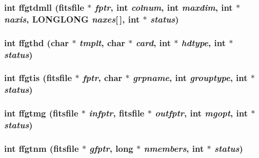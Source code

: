 \subsubsection{\setlength{\rightskip}{0pt plus 5cm}int ffgtdmll (\bf{fitsfile} $\ast$ {\em fptr}, int {\em colnum}, int {\em maxdim}, int $\ast$ {\em naxis}, \bf{LONGLONG} {\em naxes}[$\,$], int $\ast$ {\em status})}\label{fitsio_8h_37098ac493b769dba1d2055cbc7d3c28}


\subsubsection{\setlength{\rightskip}{0pt plus 5cm}int ffgthd (char $\ast$ {\em tmplt}, char $\ast$ {\em card}, int $\ast$ {\em hdtype}, int $\ast$ {\em status})}\label{fitsio_8h_d6a4e75b3a5f5458a4879db512e5dc79}


\subsubsection{\setlength{\rightskip}{0pt plus 5cm}int ffgtis (\bf{fitsfile} $\ast$ {\em fptr}, char $\ast$ {\em grpname}, int {\em grouptype}, int $\ast$ {\em status})}\label{fitsio_8h_ad66e057c6116029d10db0638ff52a79}


\subsubsection{\setlength{\rightskip}{0pt plus 5cm}int ffgtmg (\bf{fitsfile} $\ast$ {\em infptr}, \bf{fitsfile} $\ast$ {\em outfptr}, int {\em mgopt}, int $\ast$ {\em status})}\label{fitsio_8h_aada40a732e548823c7f5a64114de6b7}


\subsubsection{\setlength{\rightskip}{0pt plus 5cm}int ffgtnm (\bf{fitsfile} $\ast$ {\em gfptr}, long $\ast$ {\em nmembers}, int $\ast$ {\em status})}\label{fitsio_8h_b80f93976748e97b100bb159c245ed96}


